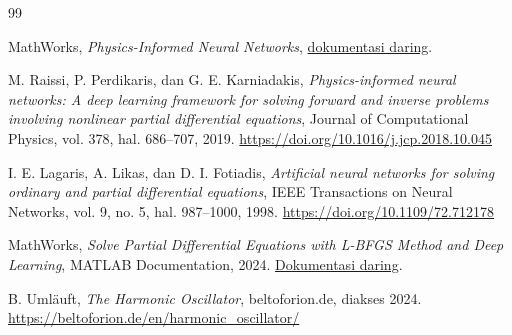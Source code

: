 \documentclass[12pt, letterpaper]{article}
\begin{document}
\begin{thebibliography}{99}

MathWorks,
\textit{Physics-Informed Neural Networks},
\href{https://www.mathworks.com/discovery/physics-informed-neural-networks.html}
{dokumentasi daring}.

M. Raissi, P. Perdikaris, dan G. E. Karniadakis,
\textit{Physics-informed neural networks: A deep learning framework for solving forward and inverse problems involving nonlinear partial differential equations},
Journal of Computational Physics, vol. 378, hal. 686--707, 2019.
\url{https://doi.org/10.1016/j.jcp.2018.10.045}

I. E. Lagaris, A. Likas, dan D. I. Fotiadis,
\textit{Artificial neural networks for solving ordinary and partial differential equations},
IEEE Transactions on Neural Networks, vol. 9, no. 5, hal. 987--1000, 1998.
\url{https://doi.org/10.1109/72.712178}

MathWorks,
\textit{Solve Partial Differential Equations with L-BFGS Method and Deep Learning},
MATLAB Documentation, 2024.
\href{https://www.mathworks.com/help/deeplearning/ug/solve-partial-differential-equations-with-lbfgs-method-and-deep-learning.html}
{Dokumentasi daring}.

B. Umläuft,
\textit{The Harmonic Oscillator},
beltoforion.de, diakses 2024.
\url{https://beltoforion.de/en/harmonic_oscillator/}

\end{thebibliography}
\end{document}
